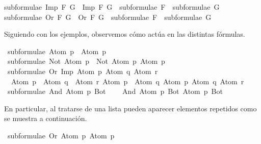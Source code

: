 \begin{isabellebody}
{\isachardoublequoteopen}subformulae\ {\isacharparenleft}Imp\ F\ G{\isacharparenright}\ {\isacharequal}\ Imp\ F\ G\ {\isacharhash}\ subformulae\ F\ {\isacharat}\ subformulae\ G{\isachardoublequoteclose}\ {\isacharbar}\isanewline
{\isachardoublequoteopen}subformulae\ {\isacharparenleft}Or\ F\ G{\isacharparenright}\ {\isacharequal}\ Or\ F\ G\ {\isacharhash}\ subformulae\ F\ {\isacharat}\ subformulae\ G{\isachardoublequoteclose}%
\begin{isamarkuptext}%
Siguiendo con los ejemplos, observemos cómo actúa  en las distintas 
fórmulas.%
\end{isamarkuptext}\isamarkuptrue%
\isamarkupfalse%
\ {\isachardoublequoteopen}subformulae\ {\isacharparenleft}Atom\ p{\isacharparenright}\ {\isacharequal}\ {\isacharbrackleft}Atom\ p{\isacharbrackright}{\isachardoublequoteclose}\isanewline
\isanewline
{}\isamarkupfalse%
\ {\isachardoublequoteopen}subformulae\ {\isacharparenleft}Not\ {\isacharparenleft}Atom\ p{\isacharparenright}{\isacharparenright}\ {\isacharequal}\ {\isacharbrackleft}Not\ {\isacharparenleft}Atom\ p{\isacharparenright}{\isacharcomma}\ Atom\ p{\isacharbrackright}{\isachardoublequoteclose}\isanewline
\isanewline
{}\isamarkupfalse%
\ {\isachardoublequoteopen}subformulae\ {\isacharparenleft}Or\ {\isacharparenleft}Imp\ {\isacharparenleft}Atom\ p{\isacharparenright}\ {\isacharparenleft}Atom\ q{\isacharparenright}{\isacharparenright}\ {\isacharparenleft}Atom\ r{\isacharparenright}{\isacharparenright}\ {\isacharequal}\ \isanewline
\ \ {\isacharbrackleft}{\isacharparenleft}Atom\ p\ \isactrlbold {\isasymrightarrow}\ Atom\ q{\isacharparenright}\ \isactrlbold {\isasymor}\ Atom\ r{\isacharcomma}\ Atom\ p\ \isactrlbold {\isasymrightarrow}\ Atom\ q{\isacharcomma}\ Atom\ p{\isacharcomma}\ Atom\ q{\isacharcomma}\ Atom\ r{\isacharbrackright}{\isachardoublequoteclose}\isanewline
\isanewline
{}\isamarkupfalse%
\ {\isachardoublequoteopen}subformulae\ {\isacharparenleft}And\ {\isacharparenleft}Atom\ p{\isacharparenright}\ Bot{\isacharparenright}\ {\isacharequal}\ \isanewline
\ \ {\isacharbrackleft}And\ {\isacharparenleft}Atom\ p{\isacharparenright}\ Bot{\isacharcomma}\ Atom\ p{\isacharcomma}\ Bot{\isacharbrackright}{\isachardoublequoteclose}%
\begin{isamarkuptext}%
En particular, al tratarse de una lista pueden aparecer elementos repetidos como se muestra a
continuación.%
\end{isamarkuptext}\isamarkuptrue%
\isamarkupfalse%
\ {\isachardoublequoteopen}subformulae\ {\isacharparenleft}Or\ {\isacharparenleft}Atom\ p{\isacharparenright}\ {\isacharparenleft}Atom\ p{\isacharparenright}{\isacharparenright}\ {\isacharequal}\ \ \isanewline

\end{isabellebody}
